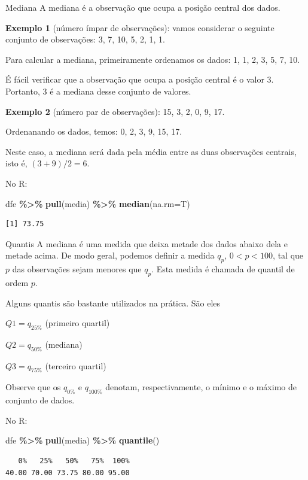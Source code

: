 \documentclass[
  9pt,
  ignorenonframetext,
  aspectratio=169]{beamer}
\newenvironment{Shaded}{\begin{snugshade}}{\end{snugshade}}
\newcommand{\DataTypeTok}[1]{\textcolor[rgb]{0.13,0.29,0.53}{#1}}
\newcommand{\KeywordTok}[1]{\textcolor[rgb]{0.13,0.29,0.53}{\textbf{#1}}}
\newcommand{\NormalTok}[1]{#1}
\newcommand{\OperatorTok}[1]{\textcolor[rgb]{0.81,0.36,0.00}{\textbf{#1}}}
\newcommand{\StringTok}[1]{\textcolor[rgb]{0.31,0.60,0.02}{#1}}
\begin{document}
\begin{frame}[fragile]{Mediana}
\protect\hypertarget{mediana}{}
A mediana é a observação que ocupa a posição central dos dados.

\textbf{Exemplo 1} (número ímpar de observações): vamos considerar o
seguinte conjunto de observações: 3, 7, 10, 5, 2, 1, 1.

Para calcular a mediana, primeiramente ordenamos os dados: 1, 1, 2, 3,
5, 7, 10.

É fácil verificar que a observação que ocupa a posição central é o valor
3. Portanto, 3 é a mediana desse conjunto de valores.

\textbf{Exemplo 2} (número par de observações): 15, 3, 2, 0, 9, 17.

Ordenanando os dados, temos: 0, 2, 3, 9, 15, 17.

Neste caso, a mediana será dada pela média entre as duas observações
centrais, isto é, \((3 + 9)/2 = 6\).

No R:

\begin{Shaded}
\begin{Highlighting}[]
\NormalTok{dfe }\OperatorTok{\%\textgreater{}\%}
\StringTok{  }\KeywordTok{pull}\NormalTok{(media) }\OperatorTok{\%\textgreater{}\%}
\StringTok{  }\KeywordTok{median}\NormalTok{(}\DataTypeTok{na.rm=}\NormalTok{T)}
\end{Highlighting}
\end{Shaded}

\begin{verbatim}
[1] 73.75
\end{verbatim}
\end{frame}

\begin{frame}[fragile]{Quantis}
\protect\hypertarget{quantis}{}
A mediana é uma medida que deixa metade dos dados abaixo dela e metade
acima. De modo geral, podemos definir a medida \(q_p\), \(0 < p < 100\),
tal que \(p%
\) das observações sejam menores que \(q_p\). Esta medida é chamada de
quantil de ordem \(p\).

Alguns quantis são bastante utilizados na prática. São eles

\(Q1 = q_{25\%}\) (primeiro quartil)

\(Q2 = q_{50\%}\) (mediana)

\(Q3 = q_{75\%}\) (terceiro quartil)

Observe que os \(q_{0\%}\) e \(q_{100\%}\) denotam, respectivamente, o
mínimo e o máximo de conjunto de dados.

No R:

\begin{Shaded}
\begin{Highlighting}[]
\NormalTok{dfe }\OperatorTok{\%\textgreater{}\%}\StringTok{ }\KeywordTok{pull}\NormalTok{(media) }\OperatorTok{\%\textgreater{}\%}\StringTok{ }\KeywordTok{quantile}\NormalTok{()}
\end{Highlighting}
\end{Shaded}

\begin{verbatim}
   0%   25%   50%   75%  100% 
40.00 70.00 73.75 80.00 95.00 
\end{verbatim}
\end{frame}
\end{document}
